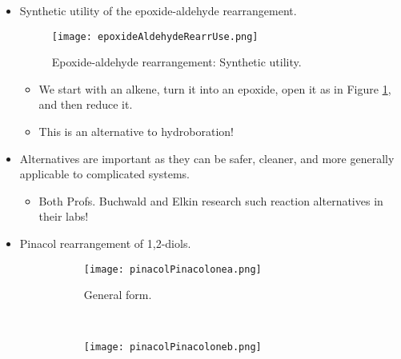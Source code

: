 \documentclass[../notes.tex]{subfiles}
\begin{document}
\begin{itemize}
\begin{figure}[h!]
        \caption{Epoxide-aldehyde rearrangement.}
        \label{fig:epoxideAldehydeRearr}
    \end{figure}
    \begin{itemize}
        \item {} is a mild Lewis acid that will coordinate to the epoxide oxygen.
        \item The epoxide can then open, formally bonding to magnesium and kicking out one bromide.
        \item The  bond then collapses into the forming aldehyde $\pi$-system with a concurrent 1,2- shift.
    \end{itemize}
    \item Synthetic utility of the epoxide-aldehyde rearrangement.
    \begin{figure}[H]
        \centering
        \texttt{[image: epoxideAldehydeRearrUse.png]}
        \caption{Epoxide-aldehyde rearrangement: Synthetic utility.}
        \label{fig:epoxideAldehydeRearrUse}
    \end{figure}
    \begin{itemize}
        \item We start with an alkene, turn it into an epoxide, open it as in Figure \ref{fig:epoxideAldehydeRearr}, and then reduce it.
        \item This is an alternative to hydroboration!
    \end{itemize}
    \item Alternatives are important as they can be safer, cleaner, and more generally applicable to complicated systems.
    \begin{itemize}
        \item Both Profs. Buchwald and Elkin research such reaction alternatives in their labs!
    \end{itemize}
    \item Pinacol rearrangement of 1,2-diols.
    \begin{figure}[h!]
        \centering
        \begin{subfigure}[b]{\linewidth}
            \centering
            \texttt{[image: pinacolPinacolonea.png]}
            \caption{General form.}
            \label{fig:pinacolPinacolonea}
        \end{subfigure}\\[2em]
        \begin{subfigure}[b]{\linewidth}
            \centering
            \texttt{[image: pinacolPinacoloneb.png]}

\end{subfigure}
\end{figure}
\end{itemize}
\end{document}
